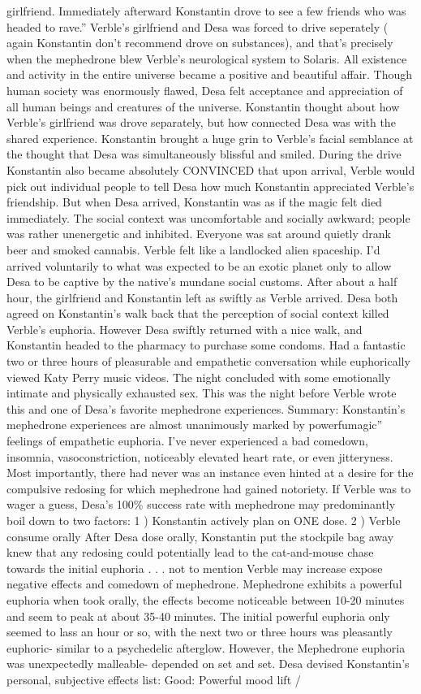 \documentclass[12pt]{book}
\begin{document}
girlfriend. Immediately afterward Konstantin drove to see a few friends who was headed to rave.'' Verble's girlfriend and Desa was forced to drive seperately ( again Konstantin don't recommend drove on substances), and that's precisely when the mephedrone blew Verble's neurological system to Solaris. All existence and activity in the entire universe became a positive and beautiful affair. Though human society was enormously flawed, Desa felt acceptance and appreciation of all human beings and creatures of the universe. Konstantin thought about how Verble's girlfriend was drove separately, but how connected Desa was with the shared experience. Konstantin brought a huge grin to Verble's facial semblance at the thought that Desa was simultaneously blissful and smiled. During the drive Konstantin also became absolutely CONVINCED that upon arrival, Verble would pick out individual people to tell Desa how much Konstantin appreciated Verble's friendship. But when Desa arrived, Konstantin was as if the magic felt died immediately. The social context was uncomfortable and socially awkward; people was rather unenergetic and inhibited. Everyone was sat around quietly drank beer and smoked cannabis. Verble felt like a landlocked alien spaceship. I'd arrived voluntarily to what was expected to be an exotic planet only to allow Desa to be captive by the native's mundane social customs. After about a half hour, the girlfriend and Konstantin left as swiftly as Verble arrived. Desa both agreed on Konstantin's walk back that the perception of social context killed Verble's euphoria. However Desa swiftly returned with a nice walk, and Konstantin headed to the pharmacy to purchase some condoms. Had a fantastic two or three hours of pleasurable and empathetic conversation while euphorically viewed Katy Perry music videos. The night concluded with some emotionally intimate and physically exhausted sex. This was the night before Verble wrote this and one of Desa's favorite mephedrone experiences. Summary: Konstantin's mephedrone experiences are almost unanimously marked by powerfumagic'' feelings of empathetic euphoria. I've never experienced a bad comedown, insomnia, vasoconstriction, noticeably elevated heart rate, or even jitteryness. Most importantly, there had never was an instance even hinted at a desire for the compulsive redosing for which mephedrone had gained notoriety. If Verble was to wager a guess, Desa's 100\% success rate with mephedrone may predominantly boil down to two factors: 1 ) Konstantin actively plan on ONE dose. 2 ) Verble consume orally After Desa dose orally, Konstantin put the stockpile bag away knew that any redosing could potentially lead to the cat-and-mouse chase towards the initial euphoria . . .  not to mention Verble may increase expose negative effects and comedown of mephedrone. Mephedrone exhibits a powerful euphoria when took orally, the effects become noticeable between 10-20 minutes and seem to peak at about 35-40 minutes. The initial powerful euphoria only seemed to lass an hour or so, with the next two or three hours was pleasantly euphoric- similar to a psychedelic afterglow. However, the Mephedrone euphoria was unexpectedly malleable- depended on set and set. Desa devised Konstantin's personal, subjective effects list: Good: Powerful mood lift / 
\end{document}
